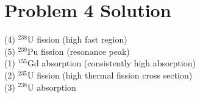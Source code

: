 \documentclass{report}
\newcommand{\tab}{\-\hspace{1.5cm}}
\begin{document}
\section*{Problem 4 Solution}


\tab\tab (4) $^{238}$U fission (high fast region) 					\\
\tab\tab (5) $^{239}$Pu fission (resonance peak)					\\
\tab\tab (1) $^{155}$Gd absorption (consistently high absorption)	\\
\tab\tab (2) $^{235}$U fission (high thermal fission cross section)	\\
\tab\tab (3) $^{238}$U absorption
\end{document}

